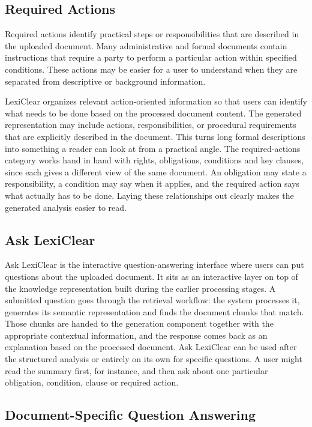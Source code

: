 \documentclass[12pt,a4paper,oneside]{report}
\begin{document}
\subsection{Required Actions}

Required actions identify practical steps or responsibilities that are described in the uploaded document. Many administrative and formal documents contain instructions that require a party to perform a particular action within specified conditions. These actions may be easier for a user to understand when they are separated from descriptive or background information.

LexiClear organizes relevant action-oriented information so that users can identify what needs to be done based on the processed document content. The generated representation may include actions, responsibilities, or procedural requirements that are explicitly described in the document. This turns long formal descriptions into something a reader can look at from a practical angle. The required-actions category works hand in hand with rights, obligations, conditions and key clauses, since each gives a different view of the same document. An obligation may state a responsibility, a condition may say when it applies, and the required action says what actually has to be done. Laying these relationships out clearly makes the generated analysis easier to read.

\subsection{Ask LexiClear}

Ask LexiClear is the interactive question-answering interface where users can put questions about the uploaded document. It sits as an interactive layer on top of the knowledge representation built during the earlier processing stages. A submitted question goes through the retrieval workflow: the system processes it, generates its semantic representation and finds the document chunks that match. Those chunks are handed to the generation component together with the appropriate contextual information, and the response comes back as an explanation based on the processed document. Ask LexiClear can be used after the structured analysis or entirely on its own for specific questions. A user might read the summary first, for instance, and then ask about one particular obligation, condition, clause or required action. 

\subsection{Document-Specific Question Answering}
\end{document}
